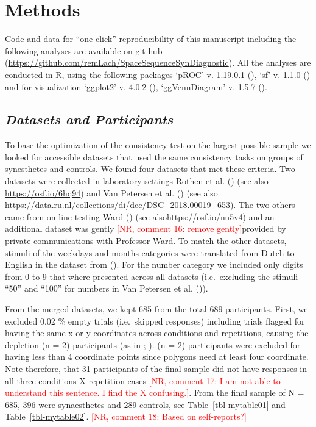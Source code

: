 \documentclass[
  man,
  longtable,
  a4paper,
  nolmodern,
  notxfonts,
  notimes,
  colorlinks=true,linkcolor=blue,citecolor=blue,urlcolor=blue]{apa7}
\begin{document}
\section{Methods}\label{methods}

Code and data for ``one-click'' reproducibility of this manuscript
including the following analyses are available on git-hub
(\url{https://github.com/remLach/SpaceSequenceSynDiagnostic}). All the
analyses are conducted in R, using the following packages `pROC' v.
1.19.0.1 (), `sf' v. 1.1.0
() and for visualization
`ggplot2' v. 4.0.2 (),
`ggVennDiagram' v. 1.5.7 ().

\subsection{\texorpdfstring{\emph{Datasets and
Participants}}{Datasets and Participants}}\label{datasets-and-participants}

To base the optimization of the consistency test on the largest possible
sample we looked for accessible datasets that used the same consistency
tasks on groups of synesthetes and controls. We found four datasets that
met these criteria. Two datasets were collected in laboratory settings
Rothen et al. () (see also
\href{https://osf.io/6hq94/files/osfstorage}{https://osf.io/6hq94}) and
Van Petersen et al. () (see also
\url{https://data.ru.nl/collections/di/dcc/DSC_2018.00019_653}). The two
others came from on-line testing Ward ()
(see also\url{https://osf.io/nu5v4}) and an additional dataset was
gently \textcolor{red}{[NR, comment 16: remove gently]}provided by
private communications with Professor Ward. To match the other datasets,
stimuli of the weekdays and months categories were translated from Dutch
to English in the dataset from (). For the number category we included only digits
from 0 to 9 that where presented across all datasets (i.e.~excluding the
stimuli ``50'' and ``100'' for numbers in Van Petersen et al.
()).

From the merged datasets, we kept 685 from the total 689 participants.
First, we excluded 0.02 \% empty trials (i.e.~skipped responses)
including trials flagged for having the same x or y coordinates across
conditions and repetitions, causing the depletion (n = 2) participants
(as in ;
). (n = 2) participants were
excluded for having less than 4 coordinate points since polygons need at
least four coordinate. Note therefore, that 31 participants of the final
sample did not have responses in all three conditions X repetition cases
\textcolor{red}{[NR, comment 17: I am not able to understand this sentence. I find the X confusing.]}.
From the final sample of N = 685, 396 were synaesthetes and 289
controls, see Table~\ref{tbl-mytable01} and Table~\ref{tbl-mytable02}.
\textcolor{red}{[NR, comment 18: Based on self-reports?]}
\end{document}
